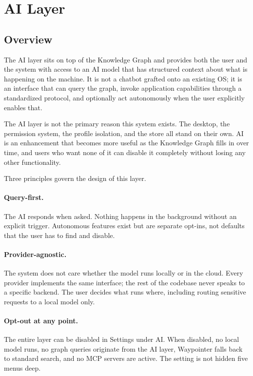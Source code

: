 \section{AI Layer}
\label{sec:ai}

\subsection{Overview}
\label{sec:ai-overview}

The AI layer sits on top of the Knowledge Graph and provides both the user and
the system with access to an AI model that has structured context about what is
happening on the machine. It is not a chatbot grafted onto an existing OS; it
is an interface that can query the graph, invoke application capabilities
through a standardized protocol, and optionally act autonomously when the user
explicitly enables that.

The AI layer is not the primary reason this system exists. The desktop, the
permission system, the profile isolation, and the store all stand on their own.
AI is an enhancement that becomes more useful as the Knowledge Graph fills in
over time, and users who want none of it can disable it completely without
losing any other functionality.

Three principles govern the design of this layer.

\paragraph{Query-first.}
The AI responds when asked. Nothing happens in the background without an
explicit trigger. Autonomous features exist but are separate opt-ins, not
defaults that the user has to find and disable.

\paragraph{Provider-agnostic.}
The system does not care whether the model runs locally or in the cloud.
Every provider implements the same interface; the rest of the codebase never
speaks to a specific backend. The user decides what runs where, including
routing sensitive requests to a local model only.

\paragraph{Opt-out at any point.}
The entire layer can be disabled in Settings under AI. When disabled, no local
model runs, no graph queries originate from the AI layer, Waypointer falls back
to standard search, and no MCP servers are active. The setting is not hidden
five menus deep.

